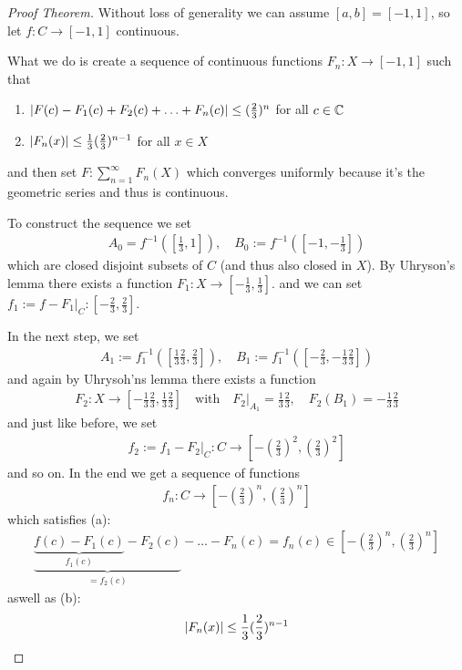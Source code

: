 \begin{proof}[Proof Theorem]
  Without loss of generality we can assume $[a,b] = [-1,1]$, so let $f: C \to [-1,1]$ continuous.

  What we do is create a sequence of continuous functions $F_n:X \to  [-1,1]$ such that
  \begin{enumerate}
    \item $\vert F(c) - F_1(c) + F_2(c) + \ldots + F_n(c)\vert \leq (\frac{2}{3})^{n}$ for all $c \in \mathbb{C}$
    \item $\vert F_n(x)\vert \leq \frac{1}{3} (\frac{2}{3})^{n-1}$ for all $x \in X$
  \end{enumerate}
  and then set $F : \sum_{n=1}^{\infty}F_n(X)$ which converges uniformly because it's the geometric series and thus is continuous.
  
  To construct the sequence we set
  \begin{align*}
    A_0 = f^{-1}([\tfrac{1}{3},1]), \quad B_0 := f^{-1}([-1,-\tfrac{1}{3}])
  \end{align*}
  which are closed disjoint subsets of $C$ (and thus also closed in $X$).
  By Uhryson's lemma there exists a function $F_1: X \to [-\tfrac{1}{3}, \tfrac{1}{3}]$.
  and we can set $f_1 := f - F_1|_C: [-\tfrac{2}{3},\tfrac{2}{3}]$.

  In the next step, we set
  \begin{align*}
    A_1 := f_1^{-1}([\frac{1}{3}\frac{2}{3}, \frac{2}{3}]), \quad B_1 := f_1^{-1}([- \frac{2}{3}, - \frac{1}{3} \frac{2}{3}])
  \end{align*}
  and again by Uhrysoh'ns lemma there exists a function 
  \begin{align*}
    F_2: X \to [- \frac{1}{3} \frac{2}{3}, \frac{1}{3} \frac{2}{3}] \quad \text{with} \quad F_2|_{A_1} = \frac{1}{3} \frac{2}{3}, \quad F_2(B_1) = -\frac{1}{3}\frac{2}{3}
  \end{align*}
  and just like before, we set 
  \begin{align*}
    f_2 := f_1 - F_2|_C : C \to [ - (\frac{2}{3})^{2}, (\frac{2}{3})^{2}]
  \end{align*}
  and so on. In the end we get a sequence of functions
  \begin{align*}
    f_n: C \to  [- (\frac{2}{3})^{n}, (\frac{2}{3})^{n}]
  \end{align*}
  which satisfies (a):
  \begin{align*}
    \underbrace{\underbrace{f(c) - F_1(c)}_{f_1(c)} - F_2(c)}_{= f_2(c)} - \ldots - F_n(c) = f_n(c) \in [-(\frac{2}{3})^{n}, (\frac{2}{3})^{n}]
  \end{align*}
  aswell as (b):
  \begin{align*}
    \vert F_n(x)\vert \leq \frac{1}{3} (\frac{2}{3})^{n-1}
  \end{align*}
\end{proof}
